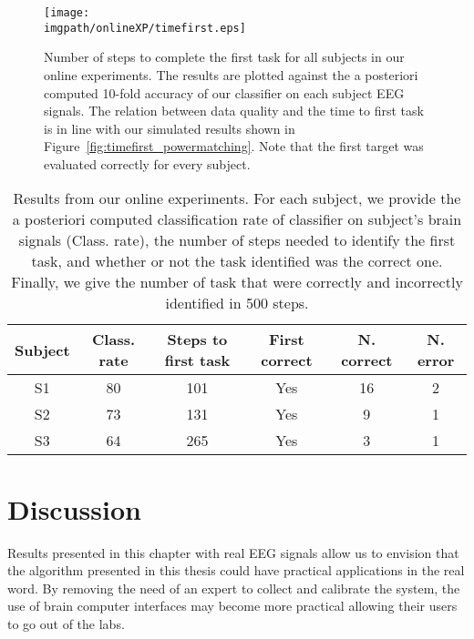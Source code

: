 \begin{figure}[!htbp]
\centering
\texttt{[image: \\imgpath/onlineXP/timefirst.eps]}
\caption{Number of steps to complete the first task for all subjects in our online experiments. The results are plotted against the a posteriori computed 10-fold accuracy of our classifier on each subject EEG signals. The relation between data quality and the time to first task is in line with our simulated results shown in Figure~\ref{fig:timefirst_powermatching}. Note that the first target was evaluated correctly for every subject.}
\label{fig:timefirst_online}
\end{figure} 


\begin{table}
\centering
{}
\begin{tabular}{c c c c c c}
    Subject & Class. rate & Steps to first task & First correct & N. correct & N. error\\ \hline
    S1 & 80 & 101 & Yes & 16 & 2\\ 
    S2 & 73 & 131 & Yes & 9 & 1\\
    S3 & 64 & 265 & Yes & 3 & 1\\
\end{tabular}
\caption{Results from our online experiments. For each subject, we provide the a posteriori computed classification rate of classifier on subject's brain signals (Class. rate), the number of steps needed to identify the first task, and whether or not the task identified was the correct one. Finally, we give the number of task that were correctly and incorrectly identified in 500 steps.} 
\label{tab:onlineXPsummary}
\end{table}


\section{Discussion}

Results presented in this chapter with real EEG signals allow us to envision that the algorithm presented in this thesis could have practical applications in the real word. By removing the need of an expert to collect and calibrate the system, the use of brain computer interfaces may become more practical allowing their users to go out of the labs.

